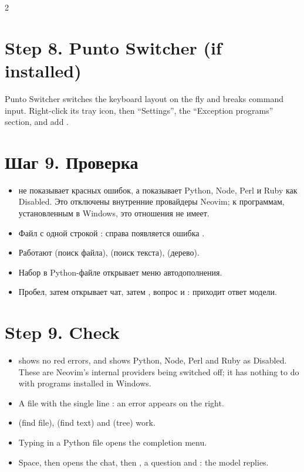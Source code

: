 \begin{paracol}{2}
\section*{Step 8. Punto Switcher (if installed)}
Punto Switcher switches the keyboard layout on the fly and breaks command input. Right-click its tray icon, then ``Settings'', the ``Exception programs'' section, and add .
\switchcolumn*

\RU
\section*{Шаг 9. Проверка}
\begin{itemize}\setlength\itemsep{1pt}
\item {} не показывает красных ошибок, а  показывает Python, Node, Perl и Ruby как Disabled. Это отключены внутренние провайдеры Neovim; к программам, установленным в Windows, это отношения не имеет.
\item Файл  с одной строкой : справа появляется ошибка .
\item Работают  (поиск файла),  (поиск текста),  (дерево).
\item Набор  в Python-файле открывает меню автодополнения.
\item Пробел, затем  открывает чат, затем , вопрос и : приходит ответ модели.
\end{itemize}
\switchcolumn
\EN
\section*{Step 9. Check}
\begin{itemize}\setlength\itemsep{1pt}
\item {} shows no red errors, and  shows Python, Node, Perl and Ruby as Disabled. These are Neovim's internal providers being switched off; it has nothing to do with programs installed in Windows.
\item A file  with the single line : an error  appears on the right.
\item {} (find file),  (find text) and  (tree) work.
\item Typing  in a Python file opens the completion menu.
\item Space, then  opens the chat, then , a question and : the model replies.
\end{itemize}
\switchcolumn*


\end{paracol}
